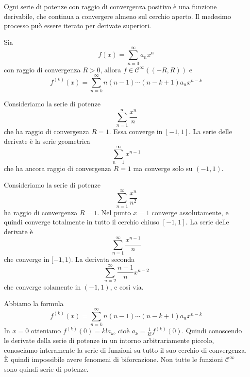 \documentclass[a4paper]{article}
\begin{document}
\begin{radioactive}
Ogni serie di potenze con raggio di convergenza positivo è una funzione derivabile,
che continua a convergere almeno sul cerchio aperto.
Il medesimo processo può essere iterato per derivate superiori.
\end{radioactive}

\begin{radioactive}
\begin{snippetcorollary}{}
    Sia \[
        f(x) = \sum_{n=0}^\infty a_nx^n
    \]
    con raggio di convergenza \(R > 0\), allora \(f\in \mathcal C^\infty((-R, R))\) e \[
        f^{(k)}(x) = \sum_{n=k}^\infty n(n-1)\cdots(n-k+1)a_nx^{n-k}
    \]
\end{snippetcorollary}
\end{radioactive}

\begin{radioactive}
\begin{snippetexample}{}
    Consideriamo la serie di potenze
    \[
        \sum_{n=1}^\infty \frac{x^n}{n}
    \]
    che ha raggio di convergenza \(R=1\).
    Essa converge in \([-1, 1]\). La serie delle derivate è la serie geometrica
    \[
        \sum_{n=1}^\infty x^{n-1}
    \]
    che ha ancora raggio di convergenza \(R=1\)
    ma converge solo su \((-1, 1)\).
\end{snippetexample}
\end{radioactive}

\begin{radioactive}
\begin{snippetcorollary}{}
    Consideriamo la serie di potenze
    \[
        \sum_{n=1}^\infty \frac{x^n}{n^2}
    \]
    ha raggio di convergenza \(R=1\).
    Nel punto \(x=1\) converge assolutamente, e quindi converge totalmente in tutto il cerchio
    chiuso \([-1, 1]\). La serie delle derivate è
    \[
        \sum_{n=1}^\infty\frac{x^{n-1}}{n}
    \]
    che converge in \([-1, 1)\). La derivata seconda
    \[
        \sum_{n=2}^\infty \frac{n-1}{n}x^{n-2}
    \]
    che converge solamente in \((-1, 1)\), e così via.
\end{snippetcorollary}
\end{radioactive}

\begin{radioactive}
Abbiamo la formula \[
    f^{(k)}(x) = \sum_{n=k}^\infty n(n-1)\cdots(n-k+1)a_nx^{n-k}
\]
In \(x=0\) otteniamo \(f^{(k)}(0) = k! a_k\), cioè \(a_k = \frac{1}{k!}f^{(k)}(0)\).
Quindi conoscendo le derivate della serie di potenze in un intorno arbitrariamente piccolo,
conosciamo interamente la serie di funzioni su tutto il suo cerchio di convergenza.
È quindi impossibile avere fenomeni di biforcazione.
Non tutte le funzioni \(\mathcal C^\infty\) sono quindi serie di potenze.
\end{radioactive}
\end{document}
